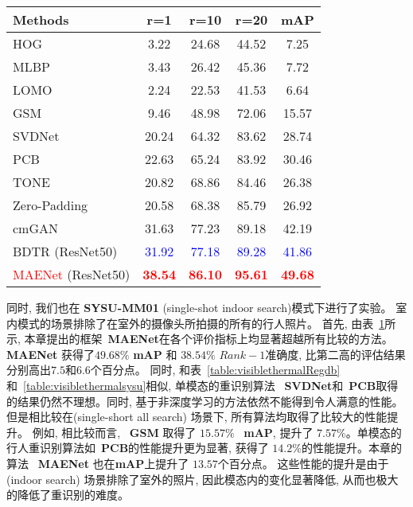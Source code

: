 \begin{table}[!htpb]
  \centering
  \begin{tabular}{cccccc}
     \\ \hline
  \multicolumn{2}{l|}{Methods} & r=1 &r=10 & r=20 & mAP   \\\hline
  
  \multicolumn{2}{l|}{HOG} & 3.22 & 24.68 & 44.52 & 7.25  \\
  \multicolumn{2}{l|}{MLBP} & 3.43 & 26.42 & 45.36 & 7.72  \\
  \multicolumn{2}{l|}{LOMO\cite{liao2015person}} &  2.24 & 22.53 & 41.53 & 6.64 \\
  \multicolumn{2}{l|}{GSM\cite{lin2016cross}} &  9.46 & 48.98 & 72.06 & 15.57  \\

  \hline
  \hline
  \multicolumn{2}{l|}{SVDNet\cite{sun2017svdnet}} & 20.24 & 64.32 & 83.62 & 28.74  \\
  \multicolumn{2}{l|}{PCB\cite{sun2018beyond}} & 22.63 & 65.24 & 83.92 & 30.46  \\ 
  \hline
  \hline
  \multicolumn{2}{l|}{TONE\cite{ye2018hierarchical}} &  20.82 & 68.86 & 84.46 & 26.38  \\
  \multicolumn{2}{l|}{Zero-Padding\cite{wu2017rgb} }& 20.58 & 68.38 & 85.79 & 26.92  \\
  \multicolumn{2}{l|}{cmGAN\cite{dai2018cross} }& 31.63 & 77.23 & 89.18 & 42.19  \\
  \multicolumn{2}{l|}{BDTR (ResNet50)\cite{ye2018visible} }& \textcolor{blue}{31.92} & \textcolor{blue}{77.18} & \textcolor{blue}{89.28} & \textcolor{blue}{41.86}  \\
  \hline
  \hline
   \multicolumn{2}{l|}{\textcolor{red}{MAENet} (ResNet50) }&\textcolor{red}{\textbf{38.54}} & \textcolor{red}{\textbf{86.10}} & \textcolor{red}{\textbf{95.61}} & \textcolor{red}{\textbf{49.68}} \\
   \hline
   \hline
  \end{tabular}
  \label{table:sysuindoor}
\end{table}
同时, 我们也在 \textbf{SYSU-MM01} (single-shot indoor search)模式下进行了实验。 室内模式的场景排除了在室外的摄像头所拍摄的所有的行人照片。 首先, 由表~\ref{table:sysuindoor}所示, 本章提出的框架~\textbf{MAENet}在各个评价指标上均显著超越所有比较的方法。 \textbf{MAENet} 获得了$49.68 \%$ \textbf{mAP} 和 $38.54 \%$ $Rank-1$准确度, 比第二高的评估结果分别高出$7.5$和$6.6$个百分点。 同时, 和表~\ref{table:visiblethermalRegdb}和~\ref{table:visiblethermalsysu}相似, 单模态的重识别算法 ~\textbf{SVDNet}和~\textbf{PCB}取得的结果仍然不理想。同时, 基于非深度学习的方法依然不能得到令人满意的性能。但是相比较在(single-short all search) 场景下, 所有算法均取得了比较大的性能提升。 例如, 相比较而言, ~\textbf{GSM} 取得了 $15.57 \%$ ~\textbf{mAP}, 提升了 $7.57 \%$。单模态的行人重识别算法如~\textbf{PCB}的性能提升更为显著, 获得了 $14.2 \%$的性能提升。本章的算法 ~\textbf{MAENet} 也在\textbf{mAP}上提升了 $13.57$个百分点。 这些性能的提升是由于 (indoor search) 场景排除了室外的照片, 因此模态内的变化显著降低, 从而也极大的降低了重识别的难度。
